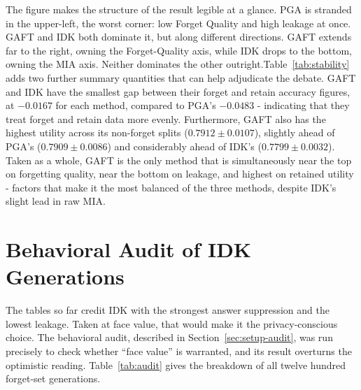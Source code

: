 \documentclass[a4paper,12pt]{report}
\begin{document}
The figure makes the structure of the result legible at a glance. PGA is stranded in the upper-left, the worst corner: low Forget Quality and high leakage at once. GAFT and IDK both dominate it, but along different directions. GAFT extends far to the right, owning the Forget-Quality axis, while IDK drops to the bottom, owning the MIA axis. Neither dominates the other outright.Table~\ref{tab:stability} adds two further summary quantities that can help adjudicate the debate. GAFT and IDK have the smallest gap between their forget and retain accuracy figures, at $-0.0167$ for each method, compared to PGA's $-0.0483$ - indicating that they treat forget and retain data more evenly. Furthermore, GAFT also has the highest utility across its non-forget splits ($0.7912 \pm 0.0107$), slightly ahead of PGA's ($0.7909 \pm 0.0086$) and considerably ahead of IDK's ($0.7799 \pm 0.0032$). Taken as a whole, GAFT is the only method that is simultaneously near the top on forgetting quality, near the bottom on leakage, and highest on retained utility - factors that make it the most balanced of the three methods, despite IDK's slight lead in raw MIA.

\begin{table}[htbp]
	\centering
	\caption{Stability and utility summary (mean $\pm$ std over three seeds). MIA range is the range of attack scores across thresholds; a smaller range and a smaller gap between forget and retain accuracy indicate more even, predictable behavior.}
	\label{tab:stability}
\end{table}

\section{Behavioral Audit of IDK Generations}
\label{sec:res-audit}
The tables so far credit IDK with the strongest answer suppression and the lowest leakage. Taken at face value, that would make it the privacy-conscious choice. The behavioral audit, described in Section~\ref{sec:setup-audit}, was run precisely to check whether ``face value'' is warranted, and its result overturns the optimistic reading. Table~\ref{tab:audit} gives the breakdown of all twelve hundred forget-set generations.
\end{document}
